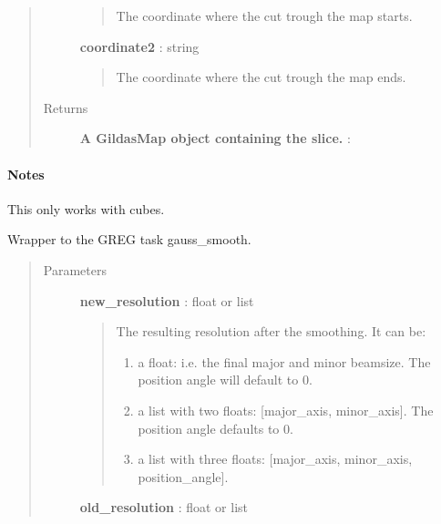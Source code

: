 \documentclass[a4paper,10pt,english]{sphinxmanual}
\begin{document}
\begin{fulllineitems}
\begin{fulllineitems}
\begin{quote}
\begin{description}
\begin{quote}
The coordinate where the cut trough the map starts.
\end{quote}

\textbf{coordinate2} : string
\begin{quote}

The coordinate where the cut trough the map ends.
\end{quote}

\item[{Returns }] \leavevmode
\textbf{A GildasMap object containing the slice.} :

\end{description}\end{quote}
\paragraph{Notes}

This only works with cubes.

\end{fulllineitems}


\begin{fulllineitems}
\label{maps:astrolyze.maps.gildas.GildasMap.smooth}
Wrapper to the GREG task gauss\_smooth.
\begin{quote}\begin{description}
\item[{Parameters }] \leavevmode
\textbf{new\_resolution} : float or list
\begin{quote}

The resulting resolution after the smoothing.
It can be:
\begin{enumerate}
\item {} 
a float: i.e. the final major and minor beamsize.
The position angle will default to 0.

\item {} 
a list with two floats: {[}major\_axis, minor\_axis{]}. The
position angle defaults to 0.

\item {} 
a list with three floats: {[}major\_axis, minor\_axis,
position\_angle{]}.

\end{enumerate}
\end{quote}

\textbf{old\_resolution} : float or list
\begin{quote}


\end{quote}
\end{description}
\end{quote}
\end{fulllineitems}
\end{fulllineitems}
\end{document}
